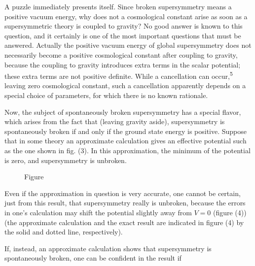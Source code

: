 A puzzle immediately presents itself. Since broken supersymmetry
means a positive vacuum energy, why does not a cosmological
constant arise as soon as a supersymmetric theory is coupled to
gravity? No good answer is known to this question, and it certainly
is one of the most important questions that must be answered. Actually
the positive vacuum energy of global supersymmetry does not necessarily
become a positive cosmological constant after coupling to
gravity, because the coupling to gravity introduces extra terms in
the scalar potential; these extra terms are not positive definite.
While a cancellation can occur,\textsuperscript{5} leaving zero cosmological constant,
such a cancellation apparently depends on a special choice of parameters,
for which there is no known rationale.

Now, the subject of spontaneously broken supersymmetry has a
special flavor, which arises from the fact that (leaving gravity
aside), supersymmetry is spontaneously broken if and only if the
ground state energy is positive. Suppose that in some theory an approximate
calculation gives an effective potential such as the one
shown in fig. (3). In this approximation, the minimum of the potential
is zero, and supersymmetry is unbroken.

\begin{figure}
\vspace{-0.5\baselineskip}
\centering
{}
\par\smallskip
Figure~\thefigure
\vspace{-0.9\baselineskip}
\end{figure}

Even if the approximation in question is very accurate, one
cannot be certain, just from this result, that supersymmetry really
is unbroken, because the errors in one's calculation may shift the
potential slightly away from $V = 0$ (figure (4)) (the approximate
calculation and the exact result are indicated in figure (4) by the
solid and dotted line, respectively).

If, instead, an approximate calculation shows that supersymmetry
is spontaneously broken, one can be confident in the result if

